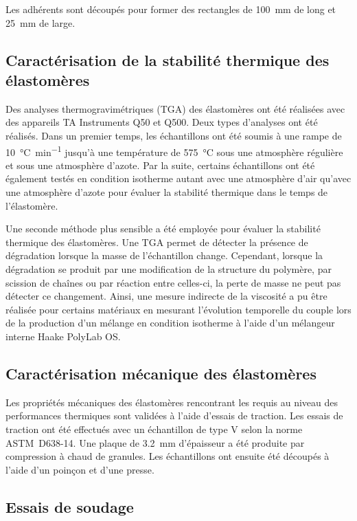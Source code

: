 Les adhérents sont découpés pour former des rectangles de \SI{100}{\milli\metre} de long et \SI{25}{\milli\metre} de large. 

\subsection{Caractérisation de la stabilité thermique des élastomères}

Des analyses thermogravimétriques (TGA) des élastomères ont été réalisées avec des appareils TA Instruments Q50 et Q500. 
Deux types d'analyses ont été réalisés. 
Dans un premier temps, les échantillons ont été soumis à une rampe de \SI{10}{\celsius\per\minute} jusqu'à une température de \SI{575}{\celsius} sous une atmosphère régulière et sous une atmosphère d'azote. 
Par la suite, certains échantillons ont été également testés en condition isotherme autant avec une atmosphère d'air qu'avec une atmosphère d'azote pour évaluer la stabilité thermique dans le temps de l'élastomère. 

Une seconde méthode plus sensible a été employée pour évaluer la stabilité thermique des élastomères. 
Une TGA permet de détecter la présence de dégradation lorsque la masse de l'échantillon change. 
Cependant, lorsque la dégradation se produit par une modification de la structure du polymère, par scission de chaînes ou par réaction entre celles-ci, la perte de masse ne peut pas détecter ce changement. 
Ainsi, une mesure indirecte de la viscosité a pu être réalisée pour certains matériaux en mesurant l'évolution temporelle du couple lors de la production d'un mélange en condition isotherme à l'aide d'un mélangeur interne Haake PolyLab OS. 

\subsection{Caractérisation mécanique des élastomères}

Les propriétés mécaniques des élastomères rencontrant les requis au niveau des performances thermiques sont validées à l'aide d'essais de traction. 
Les essais de traction ont été effectués avec un échantillon de type V selon la norme ASTM~D638-14. 
Une plaque de \SI{3.2}{\milli\metre} d'épaisseur a été produite par compression à chaud de granules. 
Les échantillons ont ensuite été découpés à l'aide d'un poinçon et d'une presse. 

\subsection{Essais de soudage}

